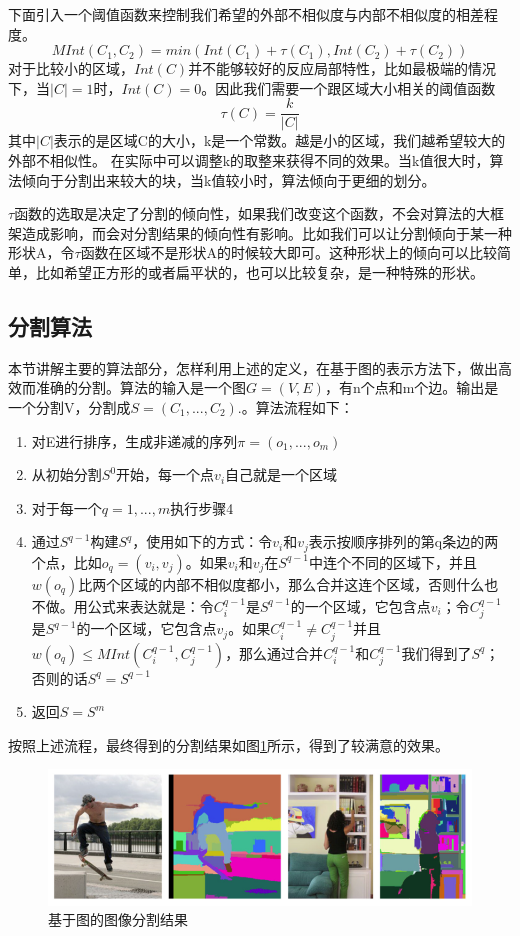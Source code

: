 下面引入一个阈值函数来控制我们希望的外部不相似度与内部不相似度的相差程度。
\begin{equation}
MInt(C_1,C_2) = min(Int(C_1) + \tau(C_1),Int(C_2) + \tau(C_2))
\end{equation}
对于比较小的区域，\(Int(C)\)并不能够较好的反应局部特性，比如最极端的情况下，当\(|C| = 1\)时，\(Int(C) = 0\)。因此我们需要一个跟区域大小相关的阈值函数
\[\tau (C) = \frac{k}{|C|}\]
其中\(|C|\)表示的是区域C的大小，k是一个常数。越是小的区域，我们越希望较大的外部不相似性。
在实际中可以调整k的取整来获得不同的效果。当k值很大时，算法倾向于分割出来较大的块，当k值较小时，算法倾向于更细的划分。

\(\tau\)函数的选取是决定了分割的倾向性，如果我们改变这个函数，不会对算法的大框架造成影响，而会对分割结果的倾向性有影响。比如我们可以让分割倾向于某一种形状A，令\(\tau\)函数在区域不是形状A的时候较大即可。这种形状上的倾向可以比较简单，比如希望正方形的或者扁平状的，也可以比较复杂，是一种特殊的形状。

\subsection{分割算法}

本节讲解主要的算法部分，怎样利用上述的定义，在基于图的表示方法下，做出高效而准确的分割。算法的输入是一个图\(G=(V,E)\)，有n个点和m个边。输出是一个分割V，分割成\(S=(C_1,...,C_2).\)。算法流程如下：

\begin{enumerate}
\item 对E进行排序，生成非递减的序列\(\pi = (o_1,...,o_m)\)
\item 从初始分割\(S^0\)开始，每一个点\(v_i\)自己就是一个区域
\item 对于每一个\(q = 1,...,m\)执行步骤4
\item 通过\(S^{q-1}\)构建\(S^q\)，使用如下的方式：令\(v_i\)和\(v_j\)表示按顺序排列的第q条边的两个点，比如\(o_q = (v_i,v_j)\)。如果\(v_i\)和\(v_j\)在\(S^{q-1}\)中连个不同的区域下，并且\(w(o_q)\)比两个区域的内部不相似度都小，那么合并这连个区域，否则什么也不做。用公式来表达就是：令\(C_{i}^{q-1}\)是\(S^{q-1}\)的一个区域，它包含点\(v_i\)；令\(C_{j}^{q-1}\)是\(S^{q-1}\)的一个区域，它包含点\(v_j\)。如果\(C_{i}^{q-1} \neq C_{j}^{q-1}\)并且\(w(o_q) \leq MInt(C_i^{q-1},C_j^{q-1})\)，那么通过合并\(C_{i}^{q-1}\)和\(C_{j}^{q-1}\)我们得到了\(S^q\)；否则的话\(S^q = S^{q-1}\)
\item 返回\(S = S^m\)
\end{enumerate}

按照上述流程，最终得到的分割结果如图\ref{fig:segment}所示，得到了较满意的效果。
\begin{figure}
\centering\includegraphics[width=15cm]{imgs/ch2/segment}
\caption{基于图的图像分割结果}
\label{fig:segment}
\end{figure}

